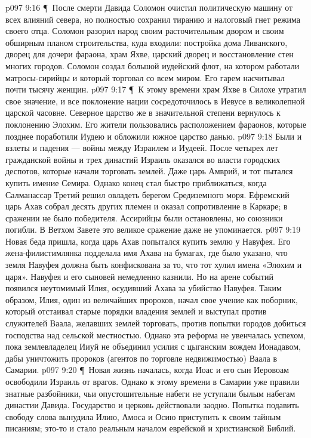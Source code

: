 \vs p097 9:16 \P\ После смерти Давида Соломон очистил политическую машину от всех влияний севера, но полностью сохранил тиранию и налоговый гнет режима своего отца. Соломон разорил народ своим расточительным двором и своим обширным планом строительства, куда входили: постройка дома Ливанского, дворец для дочери фараона, храм Яхве, царский дворец и восстановление стен многих городов. Соломон создал большой иудейский флот, на котором работали матросы\hyp{}сирийцы и который торговал со всем миром. Его гарем насчитывал почти тысячу женщин.
\vs p097 9:17 \P\ К этому времени храм Яхве в Силохе утратил свое значение, и все поклонение нации сосредоточилось в Иевусе в великолепной царской часовне. Северное царство же в значительной степени вернулось к поклонению Элохим. Его жители пользовались расположением фараонов, которые позднее поработили Иудею и обложили южное царство данью.
\vs p097 9:18 Были и взлеты и падения --- войны между Израилем и Иудеей. После четырех лет гражданской войны и трех династий Израиль оказался во власти городских деспотов, которые начали торговать землей. Даже царь Амврий, и тот пытался купить имение Семира. Однако конец стал быстро приближаться, когда Салманассар Третий решил овладеть берегом Средиземного моря. Ефремский царь Ахав собрал десять других племен и оказал сопротивление в Каркаре; в сражении не было победителя. Ассирийцы были остановлены, но союзники погибли. В Ветхом Завете это великое сражение даже не упоминается.
\vs p097 9:19 Новая беда пришла, когда царь Ахав попытался купить землю у Навуфея. Его жена\hyp{}филистимлянка подделала имя Ахава на бумагах, где было указано, что земля Навуфея должна быть конфискована за то, что тот хулил имена «Элохим и царя». Навуфея и его сыновей немедленно казнили. Но на арене событий появился неутомимый Илия, осудивший Ахава за убийство Навуфея. Таким образом, Илия, один из величайших пророков, начал свое учение как поборник, который отстаивал старые порядки владения землей и выступал против служителей Ваала, желавших землей торговать, против попытки городов добиться господства над сельской местностью. Однако эта реформа не увенчалась успехом, пока землевладелец Ииуй не объединил усилия с цыганским вождем Ионадавом, дабы уничтожить пророков (агентов по торговле недвижимостью) Ваала в Самарии.
\vs p097 9:20 \P\ Новая жизнь началась, когда Иоас и его сын Иеровоам освободили Израиль от врагов. Однако к этому времени в Самарии уже правили знатные разбойники, чьи опустошительные набеги не уступали былым набегам династии Давида. Государство и церковь действовали заодно. Попытка подавить свободу слова вынудила Илию, Амоса и Осию приступить к своим тайным писаниям; это\hyp{}то и стало реальным началом еврейской и христианской Библий.
